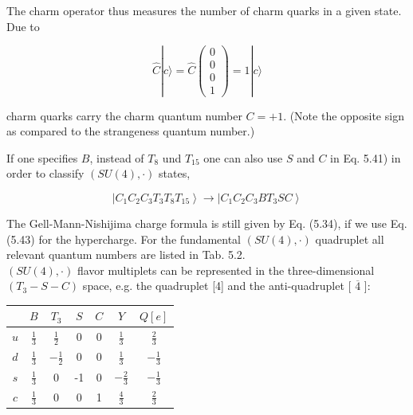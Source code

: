 \documentclass[10pt, letterpaper]{article}
\begin{document}
The charm operator thus measures the number of charm quarks in a given state. Due to

$$
\hat{C}|c\rangle=\hat{C}\left(\begin{array}{l}
0 \\
0 \\
0 \\
1
\end{array}\right)=1|c\rangle
$$

charm quarks carry the charm quantum number $C=+1$. (Note the opposite sign as compared to the strangeness quantum number.)

If one specifies $B$, instead of $T_{8}$ und $T_{15}$ one can also use $S$ and $C$ in Eq. 5.41) in order to classify $(S U(4), \cdot)$ states,

$$
\left|C_{1} C_{2} C_{3} T_{3} T_{8} T_{15}\right\rangle \longrightarrow\left|C_{1} C_{2} C_{3} B T_{3} S C\right\rangle
$$

The Gell-Mann-Nishijima charge formula is still given by Eq. (5.34), if we use Eq. (5.43) for the hypercharge. For the fundamental $(S U(4), \cdot)$ quadruplet all relevant quantum numbers are listed in Tab. 5.2.\\
$(S U(4), \cdot)$ flavor multiplets can be represented in the three-dimensional $\left(T_{3}-S-C\right)$ space, e.g. the quadruplet [4] and the anti-quadruplet [ $\overline{4}$ ]:

\begin{center}
\begin{tabular}{|c||c|c|c|c|c|c|}
\hline
 & $B$ & $T_{3}$ & $S$ & $C$ & $Y$ & $Q[e]$ \\
\hline\hline
$u$ & $\frac{1}{3}$ & $\frac{1}{2}$ & 0 & 0 & $\frac{1}{3}$ & $\frac{2}{3}$ \\
\hline
$d$ & $\frac{1}{3}$ & $-\frac{1}{2}$ & 0 & 0 & $\frac{1}{3}$ & $-\frac{1}{3}$ \\
\hline
$s$ & $\frac{1}{3}$ & 0 & -1 & 0 & $-\frac{2}{3}$ & $-\frac{1}{3}$ \\
\hline
$c$ & $\frac{1}{3}$ & 0 & 0 & 1 & $\frac{4}{3}$ & $\frac{2}{3}$ \\
\hline
\end{tabular}
\end{center}
\end{document}
